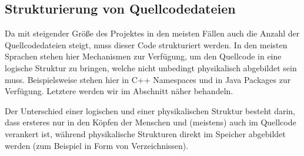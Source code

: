 \subsection{Strukturierung von Quellcodedateien} \functionalMark \imperativeMark \oopMark
	
	Da mit steigender Größe des Projektes in den meisten Fällen auch die Anzahl der Quellcodedateien steigt, muss dieser Code strukturiert werden. In den meisten Sprachen stehen hier Mechanismen zur Verfügung, um den Quellcode in eine logische Struktur zu bringen, welche nicht unbedingt physikalisch abgebildet sein muss. Beispielsweise stehen hier in C++ Namespaces und in Java Packages zur Verfügung. Letztere werden wir im Abschnitt  näher behandeln.
	
	Der Unterschied einer logischen und einer physikalischen Struktur besteht darin, dass ersteres nur in den Köpfen der Menschen und (meistens) auch im Quellcode verankert ist, während physikalische Strukturen direkt im Speicher abgebildet werden (zum Beispiel in Form von Verzeichnissen).
